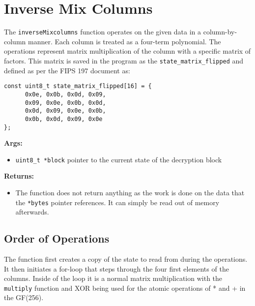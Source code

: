 \section{Inverse Mix Columns}
\label{ch:dec_inversemixcolumns}
The \lstinline{inverseMixcolumns} function operates on the given data in a column-by-column manner. Each column is treated as a four-term polynomial. The operations represent matrix multiplication of the column with a specific matrix of factors. This matrix is saved in the program as the \lstinline{state_matrix_flipped} and defined as per the FIPS 197 document as:
\begin{lstlisting}
const uint8_t state_matrix_flipped[16] = {
      0x0e, 0x0b, 0x0d, 0x09,
      0x09, 0x0e, 0x0b, 0x0d,
      0x0d, 0x09, 0x0e, 0x0b,
      0x0b, 0x0d, 0x09, 0x0e
};
\end{lstlisting}

\textbf{Args:}
\begin{itemize}
  \item \lstinline{uint8_t *block} pointer to the current state of the decryption block
\end{itemize}

\textbf{Returns:}
\begin{itemize}
  \item The function does not return anything as the work is done on the data that the \lstinline{*bytes} pointer references. It can simply be read out of memory afterwards.
\end{itemize}

\subsection{Order of Operations}
The function first creates a copy of the state to read from during the operations. It then initiates a for-loop that steps through the four first elements of the columns. Inside of the loop it is a normal matrix multiplication with the \lstinline{multiply} function and \ac{XOR} being used for the atomic operations of * and + in the GF(256).

